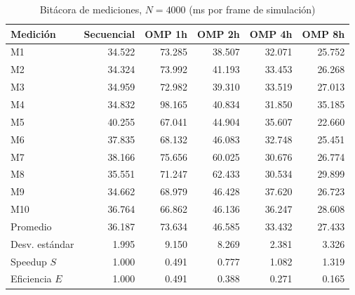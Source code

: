 \begin{table}[H]
\centering\small
\caption{Bitácora de mediciones, $N=4000$ (ms por frame de simulación)}
\begin{tabular}{lrrrrr}
\toprule
Medición & Secuencial & OMP 1h & OMP 2h & OMP 4h & OMP 8h \\
\midrule
M1 & 34.522 & 73.285 & 38.507 & 32.071 & 25.752 \\
M2 & 34.324 & 73.992 & 41.193 & 33.453 & 26.268 \\
M3 & 34.959 & 72.982 & 39.310 & 33.519 & 27.013 \\
M4 & 34.832 & 98.165 & 40.834 & 31.850 & 35.185 \\
M5 & 40.255 & 67.041 & 44.904 & 35.607 & 22.660 \\
M6 & 37.835 & 68.132 & 46.083 & 32.748 & 25.451 \\
M7 & 38.166 & 75.656 & 60.025 & 30.676 & 26.774 \\
M8 & 35.551 & 71.247 & 62.433 & 30.534 & 29.899 \\
M9 & 34.662 & 68.979 & 46.428 & 37.620 & 26.723 \\
M10 & 36.764 & 66.862 & 46.136 & 36.247 & 28.608 \\
\midrule
Promedio & 36.187 & 73.634 & 46.585 & 33.432 & 27.433 \\
Desv. estándar & 1.995 & 9.150 & 8.269 & 2.381 & 3.326 \\
Speedup $S$ & 1.000 & 0.491 & 0.777 & 1.082 & 1.319 \\
Eficiencia $E$ & 1.000 & 0.491 & 0.388 & 0.271 & 0.165 \\
\bottomrule
\end{tabular}
\end{table}

